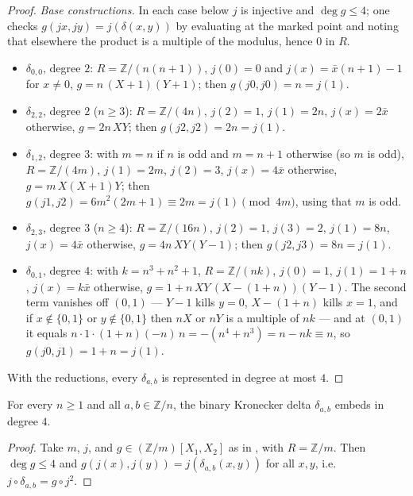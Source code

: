 \begin{proof}
\emph{Base constructions.} In each case below $j$ is injective and $\deg g \le 4$; one checks
$g(j x, j y) = j(\delta(x,y))$ by evaluating at the marked point and noting that elsewhere the
product is a multiple of the modulus, hence $0$ in $R$.
\begin{itemize}
\item $\delta_{0,0}$, degree $2$: $R = \mathbb{Z}/(n(n+1))$, $j(0) = 0$ and
$j(x) = \bar x(n+1) - 1$ for $x \ne 0$, $g = n\,(X+1)(Y+1)$; then $g(j0,j0) = n = j(1)$.
\item $\delta_{2,2}$, degree $2$ ($n \ge 3$): $R = \mathbb{Z}/(4n)$, $j(2) = 1$, $j(1) = 2n$,
$j(x) = 2\bar x$ otherwise, $g = 2n\,XY$; then $g(j2,j2) = 2n = j(1)$.
\item $\delta_{1,2}$, degree $3$: with $m = n$ if $n$ is odd and $m = n+1$ otherwise (so $m$
is odd), $R = \mathbb{Z}/(4m)$, $j(1) = 2m$, $j(2) = 3$, $j(x) = 4\bar x$ otherwise,
$g = m\,X(X+1)Y$; then $g(j1,j2) = 6m^2(2m+1) \equiv 2m = j(1) \pmod{4m}$, using that $m$ is
odd.
\item $\delta_{2,3}$, degree $3$ ($n \ge 4$): $R = \mathbb{Z}/(16n)$, $j(2) = 1$, $j(3) = 2$,
$j(1) = 8n$, $j(x) = 4\bar x$ otherwise, $g = 4n\,XY(Y-1)$; then $g(j2,j3) = 8n = j(1)$.
\item $\delta_{0,1}$, degree $4$: with $k = n^3 + n^2 + 1$, $R = \mathbb{Z}/(nk)$, $j(0) = 1$,
$j(1) = 1+n$, $j(x) = k\bar x$ otherwise, $g = 1 + n\,XY\,(X-(1+n))(Y-1)$. The second term
vanishes off $(0,1)$ — $Y-1$ kills $y = 0$, $X-(1+n)$ kills $x = 1$, and if $x \notin\{0,1\}$
or $y \notin\{0,1\}$ then $nX$ or $nY$ is a multiple of $nk$ — and at $(0,1)$ it equals
$n\cdot 1\cdot(1+n)(-n)\,n = -(n^4+n^3) = n - nk \equiv n$, so $g(j0,j1) = 1+n = j(1)$.
\end{itemize}
With the reductions, every $\delta_{a,b}$ is represented in degree at most $4$.
\end{proof}

\begin{theorem}\label{thm:quartic}
\leanok{}
For every $n \ge 1$ and all $a, b \in \mathbb{Z}/n$, the binary Kronecker delta
$\delta_{a,b}$ embeds in degree $4$.
\end{theorem}

\begin{proof}\leanok{}
Take $m$, $j$, and $g \in (\mathbb{Z}/m)[X_1,X_2]$ as in , with
$R = \mathbb{Z}/m$. Then $\deg g \le 4$ and $g(j(x), j(y)) = j(\delta_{a,b}(x,y))$ for all
$x,y$, i.e.\ $j \circ \delta_{a,b} = g \circ j^2$.
\end{proof}

